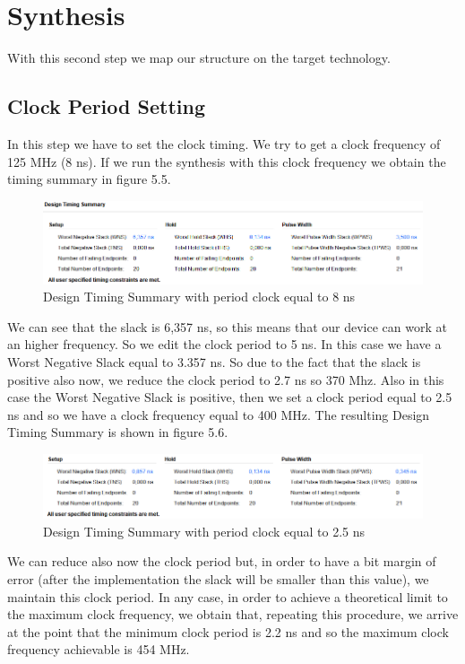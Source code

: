 \documentclass[a4paper]{report}
\begin{document}
\section{Synthesis}
With this second step we map our structure on the target technology.
\subsection{Clock Period Setting}
In this step we have to set the clock timing. We try to get a clock frequency of 125 MHz (8 ns). If we run the synthesis with this clock frequency we obtain the timing summary in figure 5.5.
\begin{figure}[htpb]
	\centering
	\includegraphics[scale=0.6]{img/vivado/timing_summary1.png}
	\caption{Design Timing Summary with period clock equal to 8 ns}
\end{figure}


\noindent We can see that the slack is 6,357 ns, so this means that our device can work at an higher frequency. So we edit the clock period to 5 ns. In this case we have a Worst Negative Slack equal to 3.357 ns.
\noindent So due to the fact that the slack is positive also now, we reduce the clock period to 2.7 ns so 370 Mhz. Also in this case the Worst Negative Slack is positive, then we set a clock period equal to 2.5 ns and so we have a clock frequency equal to 400 MHz. The resulting Design Timing Summary is shown in figure 5.6.
\begin{figure}[htpb]
	\centering
	\includegraphics[scale=0.7]{img/vivado/timing_summary3.png}
	\caption{Design Timing Summary with period clock equal to 2.5 ns}
\end{figure}

\noindent We can reduce also now the clock period but, in order to have a bit margin of error (after the implementation the slack will be smaller than this value), we maintain this clock period. In any case, in order to achieve a theoretical limit to the maximum clock frequency, we obtain that, repeating this procedure, we arrive at the point that the minimum clock period is 2.2 ns and so the maximum clock frequency achievable is 454 MHz.
\end{document}
